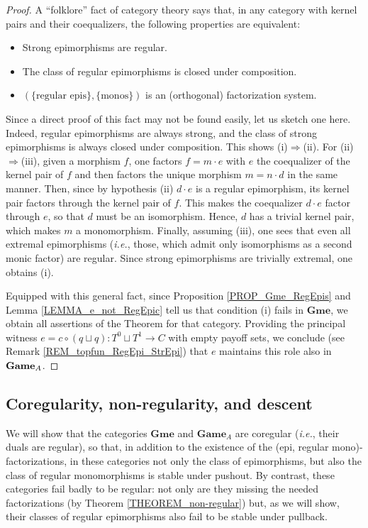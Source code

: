 \documentclass[12pt]{amsart}
\theoremstyle{definition}
\newcommand{\A}{\textup{\textmd{\textsc{A}}}}
\newcommand{\Games}{\mathbf{Game}}
\newcommand{\Gmes}{\mathbf{Gme}}
\begin{document}
\begin{proof}
	A ``folklore'' fact of category theory says that, in any category with kernel pairs and their coequalizers, the following properties are equivalent:
	\begin{itemize}
		\item[(i)] Strong epimorphisms are regular.
		\item[(ii)] The class of regular epimorphisms is closed under composition.
		\item[(iii)] $(\{\text{regular epis}\},\{\text{monos}\})$ is an (orthogonal) factorization system.
	\end{itemize}
	Since a direct proof of this fact may not be found easily, let us sketch one here. Indeed, regular epimorphisms are always strong, and the class of strong  epimorphisms is always closed under composition. This shows (i)$\Rightarrow$(ii). For (ii)$\Rightarrow$(iii), given a morphism $f$, one factors $f=m\cdot e$ with $e$ the coequalizer of the kernel pair of $f$ and then factors the unique morphism $m=n\cdot d$ in the same manner. Then, since by hypothesis (ii) $d\cdot e$ is a regular epimorphism, its kernel pair factors through the kernel pair of $f$. This makes the coequalizer $d\cdot e$ factor through $e$, so that $d$ must be an isomorphism. Hence, $d$ has a trivial kernel pair, which makes $m$ a monomorphism. Finally, assuming (iii), one sees that even all extremal epimorphisms ({\em i.e.}, those, which admit only isomorphisms as a second monic factor) are regular. Since strong epimorphisms are trivially extremal, one obtains (i).
	
	Equipped with this general fact, since Proposition \ref{PROP_Gme_RegEpis} and Lemma \ref{LEMMA_e_not_RegEpic} tell us that condition (i) fails in $\Gmes$, we obtain all assertions of the Theorem for that category. Providing the principal witness
	$e = c\circ (q\sqcup q)\colon T^0\sqcup T^1\to C$ with empty payoff sets, we conclude (see Remark \ref{REM_topfun_RegEpi_StrEpi}) that $e$ maintains this role also in $\Games_{\A}$.
\end{proof}


\subsection{Coregularity, non-regularity, and descent} We will show that the categories $\Gmes$ and $\Games_{A}$ are coregular ({\em i.e.}, their duals are regular), so that, in addition to the existence of  the (epi, regular mono)-factorizations, in these categories not only the class of epimorphisms, but also the class of regular monomorphisms is stable under pushout. By contrast, these categories fail badly to be regular: not only are they missing the needed factorizations (by Theorem \ref{THEOREM_non-regular}) but, as we will show, their classes of regular epimorphisms also fail to be stable under pullback.
\end{document}
